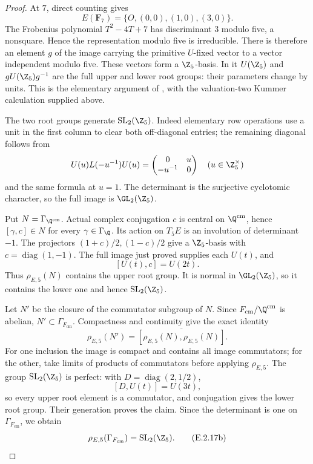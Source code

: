\begin{proof}
At \(7\), direct counting gives
\[
 E(\mathbf F_7)=\{O,(0,0),(1,0),(3,0)\}.
\]
The Frobenius polynomial \(T^2-4T+7\) has discriminant
\(3\) modulo five, a nonsquare. Hence the representation
modulo five is irreducible.
There is therefore an element \(g\) of the image carrying
the primitive \(U\)-fixed vector to a vector independent
modulo five. These vectors form a \(\Z_5\)-basis.
In it \(U(\Z_5)\) and \(gU(\Z_5)g^{-1}\) are the full
upper and lower root groups: their parameters change by
units. This is the elementary argument of
\cite[pp.265--266]{GenConradWong1999}, with the
valuation-two Kummer calculation supplied above.

The two root groups generate \(\mathrm{SL}_2(\Z_5)\).
Indeed elementary row operations use a unit in the first
column to clear both off-diagonal entries; the remaining
diagonal follows from
\[
 U(u)L(-u^{-1})U(u)
   =\begin{pmatrix}0&u\\-u^{-1}&0\end{pmatrix}
 \quad(u\in\Z_5^\times)
\]
and the same formula at \(u=1\).
The determinant is the surjective cyclotomic character, so
the full image is \(\GL_2(\Z_5)\).

Put \(N=\Gamma_{\Q^{\mathrm{cm}}}\).
Actual complex conjugation \(c\) is central on
\(\Q^{\mathrm{cm}}\), hence
\([\gamma,c]\in N\) for every \(\gamma\in\Gamma_{\Q}\).
Its action on \(T_5E\) is an involution of determinant
\(-1\). The projectors \((1+c)/2,(1-c)/2\) give a
\(\Z_5\)-basis with \(c=\operatorname{diag}(1,-1)\).
The full image just proved supplies each \(U(t)\), and
\[
 [U(t),c]=U(2t).
\]
Thus \(\rho_{E,5}(N)\) contains the upper root group.
It is normal in \(\GL_2(\Z_5)\), so it contains the lower
one and hence \(\mathrm{SL}_2(\Z_5)\).

Let \(N'\) be the closure of the commutator subgroup of
\(N\). Since \(F_{\mathrm{cm}}/\Q^{\mathrm{cm}}\) is
abelian, \(N'\subset\Gamma_{F_{\mathrm{cm}}}\).
Compactness and continuity give the exact identity
\[
 \rho_{E,5}(N')
  =\overline{[\rho_{E,5}(N),\rho_{E,5}(N)]}.
\]
For one inclusion the image is compact and contains all
image commutators; for the other, take limits of products
of commutators before applying \(\rho_{E,5}\).
The group \(\mathrm{SL}_2(\Z_5)\) is perfect:
with \(D=\operatorname{diag}(2,1/2)\),
\[
 [D,U(t)]=U(3t),
\]
so every upper root element is a commutator, and conjugation
gives the lower root group. Their generation proves the
claim. Since the determinant is one on
\(\Gamma_{F_{\mathrm{cm}}}\), we obtain
\[
 \rho_{E,5}(\Gamma_{F_{\mathrm{cm}}})
       =\mathrm{SL}_2(\Z_5).
 \tag{E.2.17b}
\]


\end{proof}
